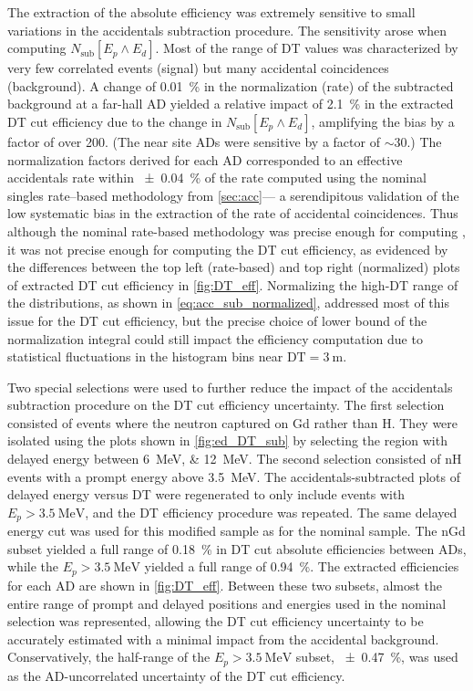 The extraction of the absolute efficiency was extremely sensitive
to small variations in the accidentals subtraction procedure.
The sensitivity arose when computing $N_\text{sub}[E_p \wedge E_d]$.
Most of the range of DT values was characterized by
very few correlated events (signal) but many accidental coincidences (background).
A change of \SI{0.01}{\percent} in the normalization (rate)
of the subtracted background at a far-hall AD
yielded a relative impact of \SI{2.1}{\percent} in the extracted DT cut efficiency
due to the change in $N_\text{sub}[E_p \wedge E_d]$,
amplifying the bias by a factor of over 200.
(The near site ADs were sensitive by a factor of $\sim30$.)
The normalization factors derived for each AD
corresponded to an effective accidentals rate
within \SI{\pm0.04}{\percent} of the rate computed
using the nominal singles rate--based methodology from \cref{sec:acc}---%
a serendipitous validation of the low systematic bias
in the extraction of the rate of accidental coincidences.
Thus although the nominal rate-based methodology was precise enough
for computing \thetaot{},
it was not precise enough for computing the DT cut efficiency,
as evidenced by the differences between the top left (rate-based)
and top right (normalized) plots of extracted DT cut efficiency in \cref{fig:DT_eff}.
Normalizing the high-DT range of the distributions,
as shown in \cref{eq:acc_sub_normalized},
addressed most of this issue for the DT cut efficiency,
but the precise choice of lower bound of the normalization integral
could still impact the efficiency computation
due to statistical fluctuations in the histogram bins near $\text{DT} = \SI{3}{\m}$.

Two special selections were used to further reduce the impact of
the accidentals subtraction procedure on the DT cut efficiency uncertainty.
The first selection consisted of events where the neutron captured on Gd
rather than H.
They were isolated using the plots shown in \cref{fig:ed_DT_sub}
by selecting the region with delayed energy between \SIlist{6;12}{\MeV}.
The second selection consisted of nH events
with a prompt energy above \SI{3.5}{\MeV}.
The accidentals-subtracted plots of delayed energy versus DT were
regenerated to only include events with $E_p > \SI{3.5}{\MeV}$,
and the DT efficiency procedure was repeated.
The same delayed energy cut was used for this modified sample
as for the nominal sample.
The nGd subset yielded a full range of \SI{0.18}{\percent}
in DT cut absolute efficiencies between ADs,
while the $E_p > \SI{3.5}{\MeV}$ yielded a full range of \SI{0.94}{\percent}.
The extracted efficiencies for each AD are shown in \cref{fig:DT_eff}.
Between these two subsets, almost the entire range
of prompt and delayed positions and energies used in the nominal selection was represented,
allowing the DT cut efficiency uncertainty to be accurately estimated
with a minimal impact from the accidental background.
Conservatively, the half-range of the $E_p > \SI{3.5}{\MeV}$ subset,
\SI{\pm0.47}{\percent}, was
used as the AD-uncorrelated uncertainty of the DT cut efficiency.

